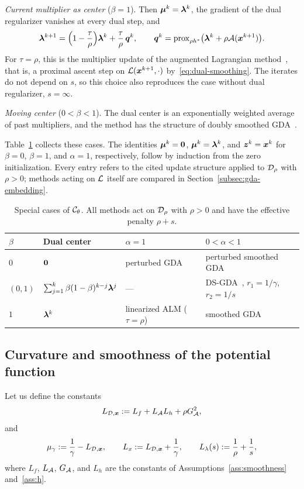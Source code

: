 \emph{Current multiplier as center} (\(\beta=1\)). Then
\(\bm{\mu}^k=\bm{\lambda}^k\), the gradient of the dual regularizer vanishes at every
dual step, and
\[
    \bm{\lambda}^{k+1}=\Bigl(1-\frac{\tau}{\rho}\Bigr)\bm{\lambda}^k+\frac{\tau}{\rho}\,\bm{q}^k,
    \qquad
    \bm{q}^k=\mathrm{prox}_{\rho h^*}\bigl(\bm{\lambda}^k+\rho\mathcal{A}(\bm{x}^{k+1})\bigr).
\]
For \(\tau=\rho\), this is the multiplier update of the augmented Lagrangian
method~\cite{hestenes1969multiplier,powell1969method,rockafellar1973multiplier},
that is, a proximal ascent step on \(\mathcal{L}(\bm{x}^{k+1},\cdot)\)
by~\eqref{eq:dual-smoothing}. The iterates do not depend on \(s\), so this
choice also reproduces the case without dual regularizer, \(s=\infty\).

\emph{Moving center} (\(0<\beta<1\)). The dual center is an exponentially
weighted average of past multipliers, and the method has the structure of doubly smoothed
GDA~\cite{zheng2023universal}.

Table~\ref{tab:special-cases} collects these cases. The identities
\(\bm{\mu}^k=\bm{0}\), \(\bm{\mu}^k=\bm{\lambda}^k\), and \(\bm{z}^k=\bm{x}^k\) for
\(\beta=0\), \(\beta=1\), and \(\alpha=1\), respectively, follow by induction
from the zero initialization. Every entry refers to the cited update structure
applied to \(\mathcal{D}_\rho\) with \(\rho>0\); methods acting on \(\mathcal{L}\) itself
are compared in Section~\ref{subsec:gda-embedding}.

\begin{table}[t]
\centering
\small
\caption{Special cases of \(\mathcal{C}_\theta\). All methods act on
\(\mathcal{D}_\rho\) with \(\rho>0\) and have the effective penalty \(\rho+s\).}
\label{tab:special-cases}
\begin{tabular}{@{}llll@{}}
\toprule
\(\beta\) & Dual center & \(\alpha=1\) & \(0<\alpha<1\) \\
\midrule
\(0\) & \(\bm{0}\)
  & perturbed GDA~\cite{lu2020hybrid,xu2023unified}
  & perturbed smoothed GDA~\cite{li2026smoothing} \\
\((0,1)\) & \(\sum_{j=1}^{k}\beta(1-\beta)^{k-j}\bm{\lambda}^j\)
  & ---
  & DS-GDA~\cite{zheng2023universal}, \(r_1=1/\gamma\), \(r_2=1/s\) \\
\(1\) & \(\bm{\lambda}^k\)
  & linearized ALM (\(\tau=\rho\))
  & smoothed GDA~\cite{zhang2020smoothed} \\
\bottomrule
\end{tabular}
\end{table}

\subsection{Curvature and smoothness of the potential function}
\label{subsec:curvature-smoothness}
Let us define the constants
\begin{equation}
    L_{\mathcal{D},\bm{x}}
    :=
    L_f + L_{\mathcal{A}}L_h + \rho G_{\mathcal{A}}^{2},
    \label{eq:x-weak-convexity-modulus}
\end{equation}
and 
\[
    \mu_\gamma
    :=
    \frac{1}{\gamma}-L_{\mathcal{D},\bm{x}},
    \qquad
    L_x
    :=
    L_{\mathcal{D},\bm{x}}+\frac{1}{\gamma},
    \qquad
    L_\lambda(s)
    :=
    \frac{1}{\rho}+\frac{1}{s},
\] where $L_f$, $L_{\mathcal{A}}$, $G_{\mathcal{A}}$, and $L_h$ are the constants of
Assumptions~\ref{ass:smoothness} and~\ref{ass:h}. 

